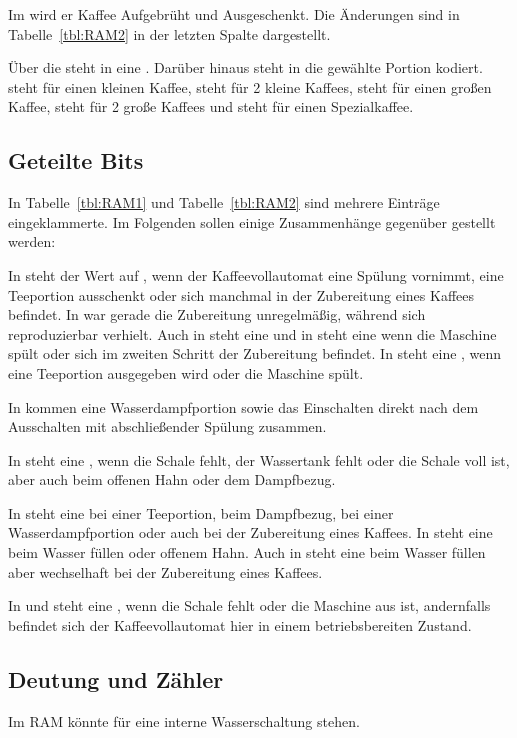 Im  wird er Kaffee Aufgebrüht und Ausgeschenkt.
Die Änderungen sind in Tabelle~\ref{tbl:RAM2} in der letzten Spalte dargestellt.

Über die  steht in  eine .
Darüber hinaus steht in  die gewählte Portion kodiert.
 steht für einen kleinen Kaffee,  steht für 2 kleine Kaffees,  steht für einen großen Kaffee,  steht für 2 große Kaffees und  steht für einen Spezialkaffee.

\subsection{Geteilte Bits}
In Tabelle~\ref{tbl:RAM1} und Tabelle~\ref{tbl:RAM2} sind mehrere Einträge eingeklammerte.
Im Folgenden sollen einige Zusammenhänge gegenüber gestellt werden:

In  steht der Wert auf , wenn der Kaffeevollautomat eine Spülung vornimmt, eine Teeportion ausschenkt oder sich manchmal in der Zubereitung eines Kaffees befindet.
In  war gerade die Zubereitung unregelmäßig, während sich  reproduzierbar verhielt.
Auch in  steht eine  und in  steht eine  wenn die Maschine spült oder sich im zweiten Schritt der Zubereitung befindet.
In  steht eine , wenn eine Teeportion ausgegeben wird oder die Maschine spült.

In  kommen eine Wasserdampfportion sowie das Einschalten direkt nach dem Ausschalten mit abschließender Spülung zusammen.

In  steht eine , wenn die Schale fehlt, der Wassertank fehlt oder die Schale voll ist, aber auch beim offenen Hahn oder dem Dampfbezug.

In  steht eine  bei einer Teeportion, beim Dampfbezug, bei einer Wasserdampfportion oder auch bei der Zubereitung eines Kaffees.
In  steht eine  beim Wasser füllen oder offenem Hahn.
Auch in  steht eine  beim Wasser füllen aber wechselhaft bei der Zubereitung eines Kaffees.

In  und  steht eine , wenn die Schale fehlt oder die Maschine aus ist, andernfalls befindet sich der Kaffeevollautomat hier in einem betriebsbereiten Zustand.

\subsection{Deutung und Zähler}
Im \ac{RAM} könnte  für eine interne Wasserschaltung stehen.

